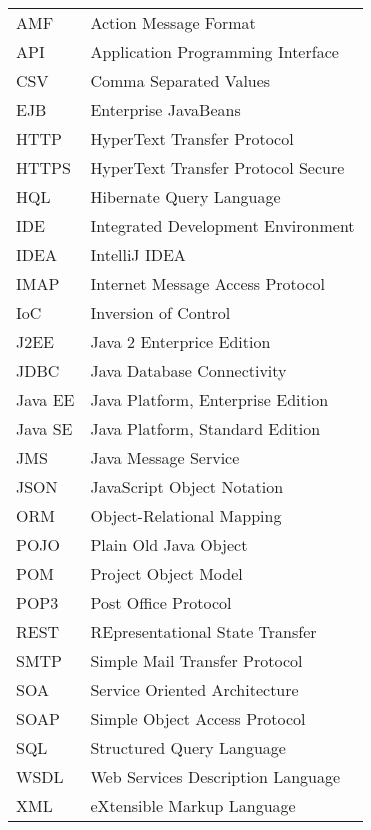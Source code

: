 
\seznamzkr

\begin{tabular}{ll}
  AMF		& Action Message Format					\\
  API		& Application Programming Interface		\\
  CSV		& Comma Separated Values				\\
  EJB		& Enterprise JavaBeans					\\
  HTTP		& HyperText Transfer Protocol			\\
  HTTPS		& HyperText Transfer Protocol Secure	\\
  HQL		& Hibernate Query Language				\\
  IDE		& Integrated Development Environment	\\
  IDEA		& IntelliJ IDEA							\\
  IMAP		& Internet Message Access Protocol		\\
  IoC		& Inversion of Control					\\
  J2EE		& Java 2 Enterprice Edition				\\
  JDBC		& Java Database Connectivity			\\
  Java EE	& Java Platform, Enterprise Edition		\\
  Java SE	& Java Platform, Standard Edition		\\
  JMS		& Java Message Service					\\
  JSON		& JavaScript Object Notation			\\
  ORM		& Object-Relational Mapping				\\
  POJO		& Plain Old Java Object					\\
  POM		& Project Object Model					\\
  POP3		& Post Office Protocol					\\
  REST		& REpresentational State Transfer		\\
  SMTP		& Simple Mail Transfer Protocol			\\
  SOA		& Service Oriented Architecture			\\
  SOAP		& Simple Object Access Protocol 		\\
  SQL		& Structured Query Language		 		\\
  WSDL		& Web Services Description Language		\\
  XML		& eXtensible Markup Language			\\
\end{tabular}

